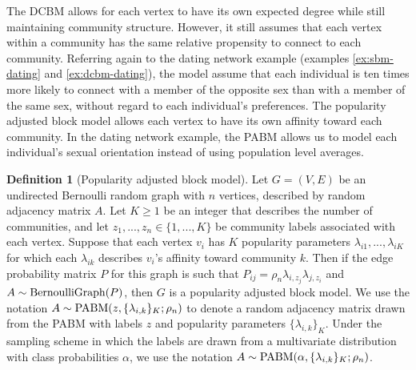 \documentclass[
  12pt,
]{article}
\theoremstyle{definition}
\newtheorem{definition}{Definition}[section]
\theoremstyle{definition}
\theoremstyle{definition}
\theoremstyle{definition}
\theoremstyle{remark}
\begin{document}
The DCBM allows for each vertex to have its own expected degree while still maintaining community structure.
However, it still assumes that each vertex within a community has the same relative propensity to connect to each community.
Referring again to the dating network example (examples \ref{ex:sbm-dating} and \ref{ex:dcbm-dating}), the model assume that each individual is ten times more likely to connect with a member of the opposite sex than with a member of the same sex, without regard to each individual's preferences.
The popularity adjusted block model \citep{307cbeb9b1be48299388437423d94bf1} allows each vertex to have its own affinity toward each community.
In the dating network example, the PABM allows us to model each individual's sexual orientation instead of using population level averages.

\begin{definition}[Popularity adjusted block model]
\label{def:pabm}
Let $G = (V, E)$ be an undirected Bernoulli random graph with $n$ vertices, described by random adjacency matrix $A$. 
Let $K \geq 1$ be an integer that describes the number of communities, and let 
$z_1, ..., z_n \in \{1, ..., K\}$ be community labels associated with each vertex. 
Suppose that each vertex $v_i$ has $K$ popularity parameters $\lambda_{i1}, ..., \lambda_{iK}$ for which each $\lambda_{ik}$ describes $v_i$'s affinity toward community $k$. 
Then if the edge probability matrix $P$ for this graph is such that $P_{ij} = \rho_n \lambda_{i, z_j} \lambda_{j, z_i}$ and $A \sim \mathrm{BernoulliGraph}(P)$, then $G$ is a popularity adjusted block model.
We use the notation $A \sim \mathrm{PABM}(z, \{\lambda_{i, k}\}_K; \rho_n)$ to denote a random adjacency matrix drawn from the PABM with labels $z$ and popularity parameters $\{\lambda_{i, k}\}_K$. 
Under the sampling scheme in which the labels are drawn from a multivariate distribution with class probabilities $\alpha$, we use the notation $A \sim \mathrm{PABM}(\alpha, \{\lambda_{i, k}\}_K; \rho_n)$. 
\end{definition}
\end{document}
